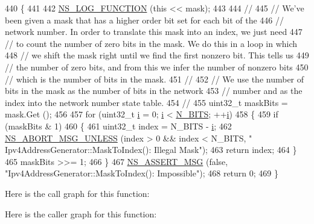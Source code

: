 \begin{DoxyCode}
440 \{
441   
442   \hyperlink{log-macros-disabled_8h_a90b90d5bad1f39cb1b64923ea94c0761}{NS\_LOG\_FUNCTION} (\textcolor{keyword}{this} << mask);
443   
444 \textcolor{comment}{//}
445 \textcolor{comment}{// We've been given a mask that has a higher order bit set for each bit of the}
446 \textcolor{comment}{// network number.  In order to translate this mask into an index, we just need}
447 \textcolor{comment}{// to count the number of zero bits in the mask.  We do this in a loop in which}
448 \textcolor{comment}{// we shift the mask right until we find the first nonzero bit.  This tells us}
449 \textcolor{comment}{// the number of zero bits, and from this we infer the number of nonzero bits}
450 \textcolor{comment}{// which is the number of bits in the mask.}
451 \textcolor{comment}{//}
452 \textcolor{comment}{// We use the number of bits in the mask as the number of bits in the network}
453 \textcolor{comment}{// number and as the index into the network number state table.}
454 \textcolor{comment}{//}
455   uint32\_t maskBits = mask.Get ();
456 
457   \textcolor{keywordflow}{for} (uint32\_t \hyperlink{bernuolliDistribution_8m_a6f6ccfcf58b31cb6412107d9d5281426}{i} = 0; \hyperlink{bernuolliDistribution_8m_a6f6ccfcf58b31cb6412107d9d5281426}{i} < \hyperlink{classns3_1_1Ipv4AddressGeneratorImpl_a76a2bff7838831dc3d1027f12e4fac85}{N\_BITS}; ++\hyperlink{bernuolliDistribution_8m_a6f6ccfcf58b31cb6412107d9d5281426}{i})
458     \{
459       \textcolor{keywordflow}{if} (maskBits & 1)
460         \{
461           uint32\_t index = N\_BITS - \hyperlink{bernuolliDistribution_8m_a6f6ccfcf58b31cb6412107d9d5281426}{i};
462           \hyperlink{group__fatal_ga0bd3f62c55e7347ff814572f3aaa3864}{NS\_ABORT\_MSG\_UNLESS} (index > 0 && index < N\_BITS, \textcolor{stringliteral}{"
      Ipv4AddressGenerator::MaskToIndex(): Illegal Mask"});
463           \textcolor{keywordflow}{return} index;
464         \}
465       maskBits >>= 1;
466     \}
467   \hyperlink{assert_8h_aff5ece9066c74e681e74999856f08539}{NS\_ASSERT\_MSG} (\textcolor{keyword}{false}, \textcolor{stringliteral}{"Ipv4AddressGenerator::MaskToIndex(): Impossible"});
468   \textcolor{keywordflow}{return} 0;
469 \}
\end{DoxyCode}


Here is the call graph for this function\+:




Here is the caller graph for this function\+:


